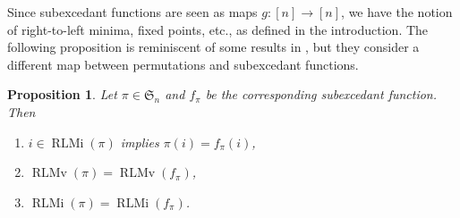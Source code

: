 \documentclass[reqno]{amsart}
\newtheorem{proposition}[theorem]{Proposition}
\theoremstyle{definition}
\newcommand{\symS}{\mathfrak{S}}
\DeclareMathOperator{\RLMv}{RLMv}
\DeclareMathOperator{\RLMi}{RLMi}
\begin{document}
Since subexcedant functions are seen as maps $g:[n] \to [n]$,
we have the notion of right-to-left minima, fixed points, etc., as defined in the introduction.
%
The following proposition is reminiscent of some results in \cite{BarilVajnovszki2017},
but they consider a different map between permutations and subexcedant functions.
%
\begin{proposition}\label{prop:rlmForSEF}
Let $\pi\in\symS_n$ and $f_{\pi}$ be the corresponding subexcedant function. 
Then
\begin{enumerate}
    \item $i \in \RLMi(\pi)$ implies $\pi(i)=f_{\pi}(i)$,
    \item $\RLMv(\pi) = \RLMv(f_{\pi})$,
    \item $\RLMi(\pi) = \RLMi(f_{\pi})$.
\end{enumerate}
\end{proposition}
\end{document}
